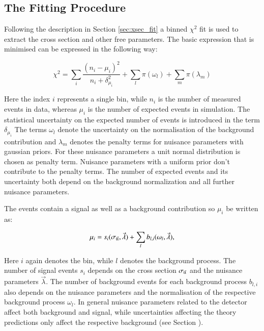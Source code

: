 	
\subsection{The Fitting Procedure}
\label{sec:xsec_stat}

Following the description in Section \ref{sec:xsec_fit} a binned $\chi^2$ fit is used to extract the cross section and other free parameters.
The basic expression that is minimised can be expressed in the following way:

\begin{equation}
  \chi^2  = \sum_{i} \frac{(n_i-\mu_i)^2}{n_i + \delta_{\mu_i}^2} + \sum_{l} \pi(\omega_l) + \sum_{m} \pi(\lambda_m)
\label{eq:xsec_chisqfunct}
\end{equation}

Here the index $i$ represents a single bin, while $n_i$ is the number of measured events in data, whereas $\mu_i$ is the number
of expected events in simulation. The statistical uncertainty on the expected number of events is introduced in the term $\delta_{\mu_i}$ The terms $\omega_l$ denote the uncertainty on the normalisation of the background contribution and $\lambda_m$
denotes the penalty terms for nuisance parameters with gaussian priors. For these nuisance parameters a unit normal distribution is chosen as penalty term. Nuisance parameters with a uniform prior don't contribute to the penalty terms.
The number of expected events and its uncertainty both depend on the background normalization and all further nuisance parameters.

The events contain a signal as well as a background contribution so $\mu_i$ be written as:

\begin{equation}
\mu_i = s_i(\sigma_\mathrm{t\bar{t}},\vec{\lambda}) 
+ \sum_{l} b_{l,i}(\omega_l,\vec{\lambda}),
\label{eq:xsec_expectev}
\end{equation} 

Here $i$ again denotes the bin, while $l$ denotes the background process. The number of signal events $s_i$ depends on the \ttbar cross section $\sigma_\mathrm{t\bar{t}}$ and the nuisance parameters $\vec{\lambda}$.
The number of background events for each background process $b_{l,i}$ also depends on the nuisance parameters and the normalisation of the respective background process $\omega_l$.
In general nuisance parameters related to the detector affect both background and signal, while uncertainties affecting the theory predictions only affect the respective background (see Section ).

